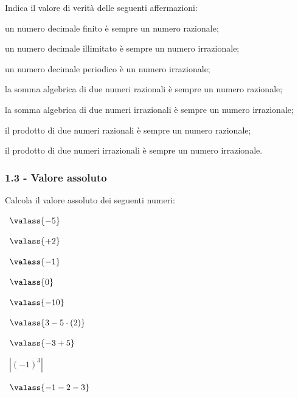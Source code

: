 \begin{esercizio}[\Ast]
\label{ese:1.6}
Indica il valore di verità delle seguenti affermazioni:
\begin{enumeratea}
\item un numero decimale finito è sempre un numero razionale;
\item un numero decimale illimitato è sempre un numero irrazionale;
\item un numero decimale periodico è un numero irrazionale;
\item la somma algebrica di due numeri razionali è sempre un numero razionale;
\item la somma algebrica di due numeri irrazionali è sempre un numero irrazionale;
\item il prodotto di due numeri razionali è sempre un numero razionale;
\item il prodotto di due numeri irrazionali è sempre un numero irrazionale.
\end{enumeratea}
\end{esercizio}

\subsubsection*{1.3 - Valore assoluto}
\begin{esercizio}[\Ast]
\label{ese:1.7}
 Calcola il valore assoluto dei seguenti numeri:
\begin{multicols}{3}
 \begin{enumeratea}
 \item~$\valass{-5}$
 \item~$\valass{+2}$
 \item~$\valass{-1}$
 \item~$\valass{0}$
 \item~$\valass{-10}$
 \item~$\valass{3-5\cdot(2)}$
 \item~$\valass{-3+5}$
 \item~$\left|{(-1)^3}\right|$
 \item~$\valass{-1-2-3}$
 \end{enumeratea}
 \end{multicols}
\end{esercizio}

